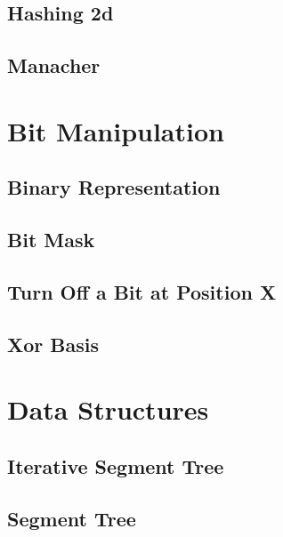 \documentclass[10pt]{article}
\begin{document}
\subsection{\texorpdfstring{{Hashing 2d}}{{Hashing 2d}}}

\subsection{\texorpdfstring{{Manacher}}{{Manacher}}}


\section{Bit Manipulation}
\subsection{\texorpdfstring{{Binary Representation}}{{Binary Representation}}}

\subsection{\texorpdfstring{{Bit Mask}}{{Bit Mask}}}

\subsection{\texorpdfstring{{Turn Off a Bit at Position X}}{{Turn Off a Bit at Position X}}}

\subsection{\texorpdfstring{{Xor Basis}}{{Xor Basis}}}


\section{Data Structures}
\subsection{\texorpdfstring{{Iterative Segment Tree}}{{Iterative Segment Tree}}}

\subsection{\texorpdfstring{{Segment Tree}}{{Segment Tree}}}

\end{document}
